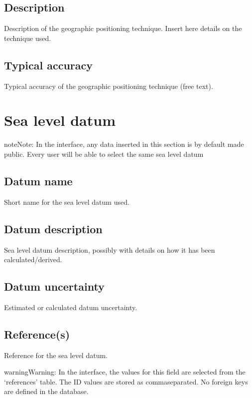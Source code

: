 \documentclass[letterpaper,10pt,english]{sphinxmanual}
\begin{document}
\subsection{Description}
\label{\detokenize{Metadata:description}}
Description of the geographic positioning technique. Insert here details on the technique used.


\subsection{Typical accuracy}
\label{\detokenize{Metadata:typical-accuracy}}
Typical accuracy of the geographic positioning technique (free text).


\section{Sea level datum}
\label{\detokenize{Metadata:sea-level-datum}}
\begin{sphinxadmonition}{note}{Note:}
In the interface, any data inserted in this section is by default made public. Every user will be able to select the same sea level datum
\end{sphinxadmonition}


\subsection{Datum name}
\label{\detokenize{Metadata:datum-name}}
Short name for the sea level datum used.


\subsection{Datum description}
\label{\detokenize{Metadata:datum-description}}
Sea level datum description, possibly with details on how it has been calculated/derived.


\subsection{Datum uncertainty}
\label{\detokenize{Metadata:datum-uncertainty}}
Estimated or calculated datum uncertainty.


\subsection{Reference(s)}
\label{\detokenize{Metadata:reference-s}}
Reference for the sea level datum.

\begin{sphinxadmonition}{warning}{Warning:}
In the interface, the values for this field are selected from the ‘references’ table. The ID values are stored as comma\sphinxhyphen{}separated. No foreign keys are defined in the database.
\end{sphinxadmonition}
\end{document}
